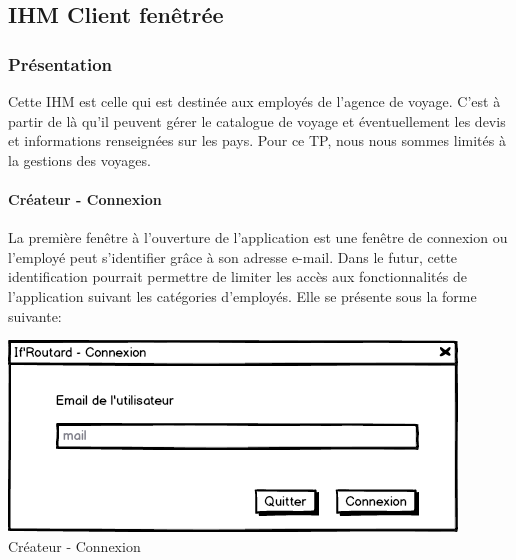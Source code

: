 \documentclass[12pt]{article}
\begin{document}
\subsection{IHM Client fenêtrée}
\subsubsection{Présentation}
Cette IHM est celle qui est destinée aux employés de l'agence de voyage. C'est à partir de là qu'il peuvent gérer le catalogue de voyage et éventuellement les devis et informations renseignées sur les pays. Pour ce TP, nous nous sommes limités à  la gestions des voyages. 
\paragraph{Créateur - Connexion}
La première fenêtre à l'ouverture de l'application est une fenêtre de connexion ou l'employé peut s'identifier grâce à son adresse e-mail. Dans le futur, cette identification pourrait permettre de limiter les accès aux fonctionnalités de l'application suivant les catégories d'employés. Elle se présente sous la forme suivante:
\begin{center}
\includegraphics[scale = 0.6]{../Conception_graphique/png_Pour_CR/Createur-00-Connexion.png}
\newline
Créateur - Connexion
\label{fig:Cr-Connexion}
\end{center}
\end{document}
